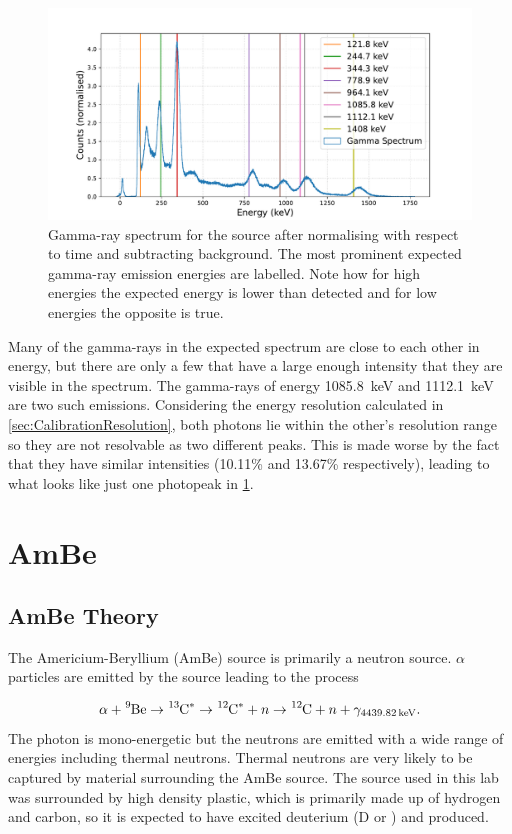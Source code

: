 \documentclass[11pt]{article}
\numberwithin{equation}{section}
\numberwithin{figure}{section}
\numberwithin{table}{section}
\begin{document}
\begin{figure}[h]
    \begin{center}
        \includegraphics[width=.8\textwidth]{Plots/eu.pdf}
        \caption{Gamma-ray spectrum for the  source after normalising with respect to time and subtracting background. The most prominent expected gamma-ray emission energies are labelled. Note how for high energies the expected energy is lower than detected and for low energies the opposite is true.}
        \label{fig:Eu_Spectrum}
    \end{center}
\end{figure}

Many of the gamma-rays in the expected  spectrum are close to each other in energy, but there are only a few that have a large enough intensity that they are visible in the spectrum. The gamma-rays of energy \SI{1085.8}{\kilo\electronvolt} and \SI{1112.1}{\kilo\electronvolt} are two such emissions. Considering the energy resolution calculated in \cref{sec:CalibrationResolution}, both photons lie within the other's resolution range so they are not resolvable as two different peaks. This is made worse by the fact that they have similar intensities (10.11\% and 13.67\% respectively), leading to what looks like just one photopeak in \cref{fig:Eu_Spectrum}.

\section{AmBe}\label{sec:AmBe}

\subsection{AmBe Theory}\label{sec:AmBeTheory}
The Americium-Beryllium (AmBe) source is primarily a neutron source. $\alpha$ particles are emitted by the  source leading to the process

\begin{equation}
    \alpha + \ce{^{9}Be} \rightarrow \ce{^{13}C^*} \rightarrow \ce{^{12}C^*}+n \rightarrow \ce{^{12}C}+n+\gamma_{\SI{4439.82}{\kilo\electronvolt}}.
    \label{eqn:AmBeProcess}
\end{equation}
The photon is mono-energetic but the neutrons are emitted with a wide range of energies including thermal neutrons. Thermal neutrons are very likely to be captured by material surrounding the AmBe source. The source used in this lab was surrounded by high density plastic, which is primarily made up of hydrogen and carbon, so it is expected to have excited deuterium (D or ) and  produced. 
\end{document}
